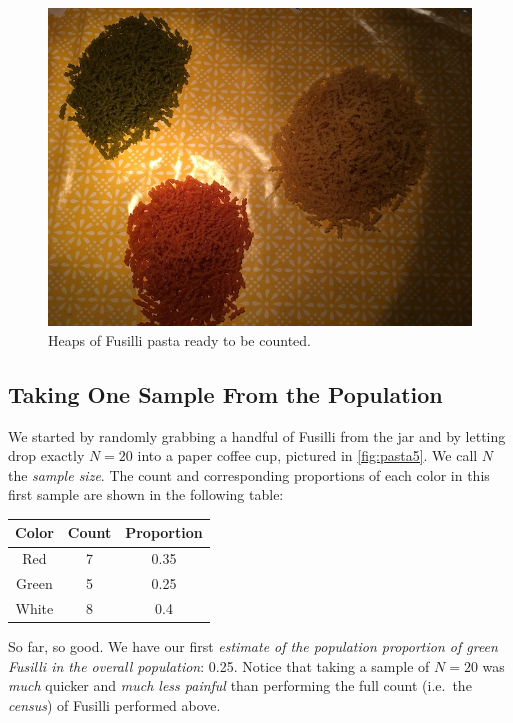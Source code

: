 \documentclass[]{book}
\begin{document}
\begin{figure}

{\centering \includegraphics[width=0.9\linewidth]{images/pasta3} 

}

\caption{Heaps of Fusilli pasta ready to be counted.}\label{fig:pasta3}
\end{figure}

\hypertarget{taking-one-sample-from-the-population}{%
\subsection{Taking One Sample From the Population}\label{taking-one-sample-from-the-population}}

We started by randomly grabbing a handful of Fusilli from the jar and by letting drop exactly \(N=20\) into a paper coffee cup, pictured in \ref{fig:pasta5}. We call \(N\) the \emph{sample size}. The count and corresponding proportions of each color in this first sample are shown in the following table:

\begin{longtable}[]{@{}ccc@{}}
\toprule
Color & Count & Proportion\tabularnewline
\midrule
\endhead
Red & 7 & 0.35\tabularnewline
Green & 5 & 0.25\tabularnewline
White & 8 & 0.4\tabularnewline
\bottomrule
\end{longtable}

So far, so good. We have our first \emph{estimate of the population proportion of green Fusilli in the overall population}: 0.25. Notice that taking a sample of \(N=20\) was \emph{much} quicker and \emph{much less painful} than performing the full count (i.e.~the \emph{census}) of Fusilli performed above.
\end{document}
